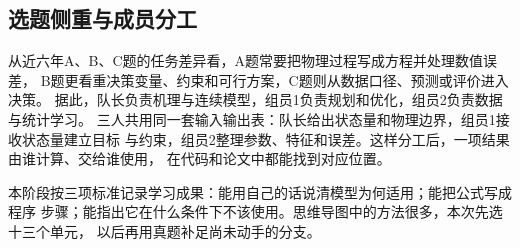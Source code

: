 \subsection{选题侧重与成员分工}

从近六年A、B、C题的任务差异看，A题常要把物理过程写成方程并处理数值误差，
B题更看重决策变量、约束和可行方案，C题则从数据口径、预测或评价进入决策。
据此，队长负责机理与连续模型，组员1负责规划和优化，组员2负责数据与统计学习。
三人共用同一套输入输出表：队长给出状态量和物理边界，组员1接收状态量建立目标
与约束，组员2整理参数、特征和误差。这样分工后，一项结果由谁计算、交给谁使用，
在代码和论文中都能找到对应位置。

本阶段按三项标准记录学习成果：能用自己的话说清模型为何适用；能把公式写成程序
步骤；能指出它在什么条件下不该使用。思维导图中的方法很多，本次先选十三个单元，
以后再用真题补足尚未动手的分支。

